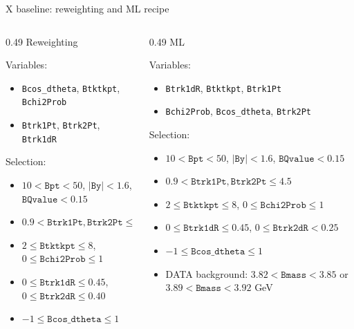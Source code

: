 \begin{frame}[label=p7]{X baseline: reweighting and ML recipe}
  \small
  \begin{columns}[T,onlytextwidth]
    \begin{column}{0.49\textwidth}
      \centering
      Reweighting\par
      \vspace{0.25em}
      \raggedright
      Variables:
      \begin{itemize}
        \setlength{\itemsep}{0.05em}
        \item \texttt{Bcos\_dtheta}, \texttt{Btktkpt}, \texttt{Bchi2Prob}
        \item \texttt{Btrk1Pt}, \texttt{Btrk2Pt}, \texttt{Btrk1dR}
      \end{itemize}
      Selection:
      \begin{itemize}
        \setlength{\itemsep}{0.05em}
        \item $10<\texttt{Bpt}<50$, $|\texttt{By}|<1.6$, $\texttt{BQvalue}<0.15$
        \item $0.9<\texttt{Btrk1Pt},\texttt{Btrk2Pt}\leq4.5$
        \item $2\leq\texttt{Btktkpt}\leq8$, $0\leq\texttt{Bchi2Prob}\leq1$
        \item $0\leq\texttt{Btrk1dR}\leq0.45$, $0\leq\texttt{Btrk2dR}\leq0.40$
        \item $-1\leq\texttt{Bcos\_dtheta}\leq1$
      \end{itemize}
    \end{column}
    \begin{column}{0.49\textwidth}
      \centering
      ML\par
      \vspace{0.25em}
      \raggedright
      Variables:
      \begin{itemize}
        \setlength{\itemsep}{0.05em}
        \item \texttt{Btrk1dR}, \texttt{Btktkpt}, \texttt{Btrk1Pt}
        \item \texttt{Bchi2Prob}, \texttt{Bcos\_dtheta}, \texttt{Btrk2Pt}
      \end{itemize}
      Selection:
      \begin{itemize}
        \setlength{\itemsep}{0.05em}
        \item $10<\texttt{Bpt}<50$, $|\texttt{By}|<1.6$, $\texttt{BQvalue}<0.15$
        \item $0.9<\texttt{Btrk1Pt},\texttt{Btrk2Pt}\leq4.5$
        \item $2\leq\texttt{Btktkpt}\leq8$, $0\leq\texttt{Bchi2Prob}\leq1$
        \item $0\leq\texttt{Btrk1dR}\leq0.45$, $0\leq\texttt{Btrk2dR}<0.25$
        \item $-1\leq\texttt{Bcos\_dtheta}\leq1$
        \item DATA background: $3.82<\texttt{Bmass}<3.85$ or $3.89<\texttt{Bmass}<3.92$ GeV
      \end{itemize}
    \end{column}
  \end{columns}
\end{frame}

